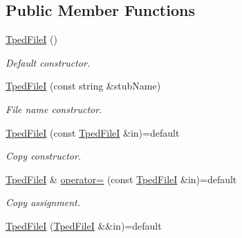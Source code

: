 \subsection*{Public Member Functions}
\begin{DoxyCompactItemize}
\item 
\mbox{\label{classvarfiles_1_1_tped_file_i_a682ccc2e842cac9396d5e36fc2d702ad}} 
\hyperlink{classvarfiles_1_1_tped_file_i_a682ccc2e842cac9396d5e36fc2d702ad}{Tped\+FileI} ()
\begin{DoxyCompactList}\small\item\em Default constructor. \end{DoxyCompactList}\item 
\hyperlink{classvarfiles_1_1_tped_file_i_a85c46b1c40742eed1d71d46329661c92}{Tped\+FileI} (const string \&stub\+Name)
\begin{DoxyCompactList}\small\item\em File name constructor. \end{DoxyCompactList}\item 
\mbox{\label{classvarfiles_1_1_tped_file_i_a6a533adc0dc43e8fb2abf08499fba68e}} 
\hyperlink{classvarfiles_1_1_tped_file_i_a6a533adc0dc43e8fb2abf08499fba68e}{Tped\+FileI} (const \hyperlink{classvarfiles_1_1_tped_file_i}{Tped\+FileI} \&in)=default
\begin{DoxyCompactList}\small\item\em Copy constructor. \end{DoxyCompactList}\item 
\mbox{\label{classvarfiles_1_1_tped_file_i_a29201e10f6d819b6dcbe34f8a39dd9b2}} 
\hyperlink{classvarfiles_1_1_tped_file_i}{Tped\+FileI} \& \hyperlink{classvarfiles_1_1_tped_file_i_a29201e10f6d819b6dcbe34f8a39dd9b2}{operator=} (const \hyperlink{classvarfiles_1_1_tped_file_i}{Tped\+FileI} \&in)=default
\begin{DoxyCompactList}\small\item\em Copy assignment. \end{DoxyCompactList}\item 
\mbox{\label{classvarfiles_1_1_tped_file_i_a840544a82a60f58c1ff559f956628bac}} 
\hyperlink{classvarfiles_1_1_tped_file_i_a840544a82a60f58c1ff559f956628bac}{Tped\+FileI} (\hyperlink{classvarfiles_1_1_tped_file_i}{Tped\+FileI} \&\&in)=default

\end{DoxyCompactItemize}
